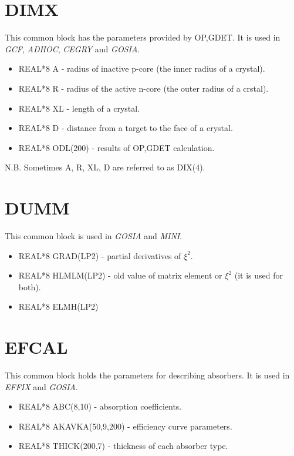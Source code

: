 \section{DIMX}

This common block has the parameters provided by OP,GDET. It is used in \emph{
GCF}, \emph{ADHOC}, \emph{CEGRY} and \emph{GOSIA}.

\begin{itemize}
\item REAL*8 A - radius of inactive p-core (the inner radius of a crystal).
\item REAL*8 R - radius of the active n-core (the outer radius of a crstal).
\item REAL*8 XL - length of a crystal.
\item REAL*8 D - distance from a target to the face of a crystal.
\item REAL*8 ODL(200) - results of OP,GDET calculation.
\end{itemize}

N.B. Sometimes A, R, XL, D are referred to as DIX(4).

\section{DUMM}

This common block is used in \emph{GOSIA} and \emph{MINI}.

\begin{itemize}
\item REAL*8 GRAD(LP2) - partial derivatives of $\xi^2$.
\item REAL*8 HLMLM(LP2) - old value of matrix element or $\xi^2$ (it is used
for both).
\item REAL*8 ELMH(LP2)
\end{itemize}

\section{EFCAL}

This common block holds the parameters for describing absorbers. It is used
in \emph{EFFIX} and \emph{GOSIA}.

\begin{itemize}
\item REAL*8 ABC(8,10) - absorption coefficients.
\item REAL*8 AKAVKA(50,9,200) - efficiency curve parameters.
\item REAL*8 THICK(200,7) - thickness of each absorber type.
\end{itemize}

